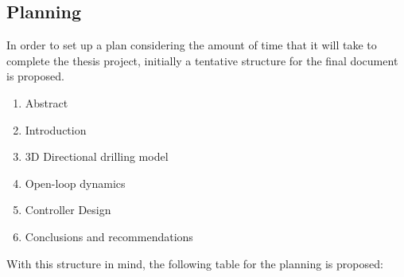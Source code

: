 \documentclass[main.tex]{subfiles}
\begin{document}
	
\vspace{20pt}
\subsection{Planning}

In order to set up a plan considering the amount of time that it will take to complete the thesis project, initially a tentative structure for the final document is proposed. 

\begin{enumerate}
	\item Abstract
	\item Introduction
	\item 3D Directional drilling model
	\item Open-loop dynamics
	\item Controller Design
	\item Conclusions and recommendations
\end{enumerate}
   
With this structure in mind, the following table for the planning is proposed:
   
\end{document}
